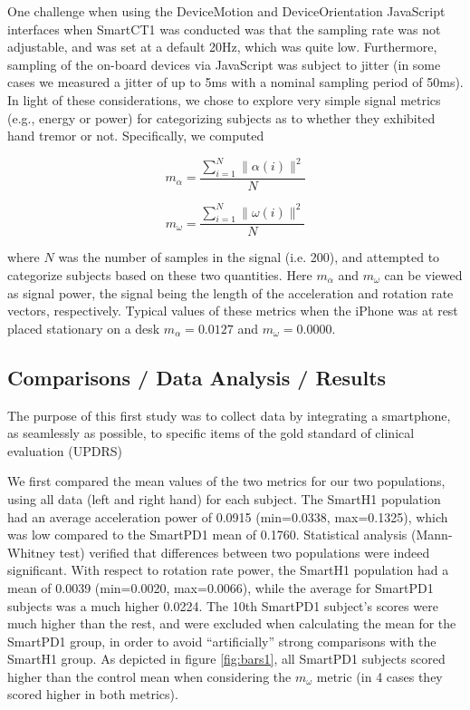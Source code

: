 One challenge when using the DeviceMotion and DeviceOrientation JavaScript interfaces when \gls{SmartCT1} was conducted was that the sampling rate was not adjustable, and was set at a default 20Hz, which was quite low. Furthermore, sampling of the on-board devices via JavaScript was subject to jitter (in some cases we measured a jitter of up to 5ms with a nominal sampling period of 50ms). In light of these considerations, we chose to explore very simple signal metrics (e.g., energy or power) for categorizing subjects as to whether they exhibited hand tremor or not. Specifically, we computed

\begin{equation}
m_{\alpha} = \frac{\sum_{i=1}^{N} \|\alpha(i)\|^{2} }{N}
\end{equation}

\begin{equation}
m_{\omega} = \frac{\sum_{i=1}^{N} \|\omega(i)\|^{2} }{N}
\end{equation}

where $N$ was the number of samples in the signal (i.e. 200), and attempted to categorize subjects based on these two quantities. Here $m_{\alpha}$ and $m_{\omega}$ can be viewed as signal power, the signal being the length of the acceleration and rotation rate vectors, respectively. Typical values of these metrics when the iPhone was at rest placed stationary on a desk $m_{\alpha}=0.0127$ and  $m_{\omega}=0.0000$.

\subsection{Comparisons / Data Analysis / Results}
\label{subsec:SmartCT1Results}
The purpose of this first study was to collect data by integrating a smartphone, as seamlessly as possible, to specific items of the gold standard of clinical evaluation (\gls{UPDRS})

We first compared the mean values of the two metrics for our two populations, using all data (left and right hand) for each subject. The \gls{SmartH1} population had an average acceleration power of 0.0915 (min=0.0338, max=0.1325), which was low compared to the \gls{SmartPD1} mean of 0.1760. Statistical analysis (Mann-Whitney test) verified that differences between two populations were indeed significant. With respect to rotation rate power, the \gls{SmartH1} population had a mean of 0.0039 (min=0.0020, max=0.0066), while the average for \gls{SmartPD1} subjects was a much higher 0.0224. The 10th \gls{SmartPD1} subject's scores were much higher than the rest, and were excluded when calculating the mean for the \gls{SmartPD1} group, in order to avoid ``artificially'' strong comparisons with the \gls{SmartH1} group. As depicted in figure \ref{fig:bars1}, all \gls{SmartPD1} subjects scored higher than the control mean when considering the $m_{\omega}$ metric (in 4 cases they scored higher in both metrics).

